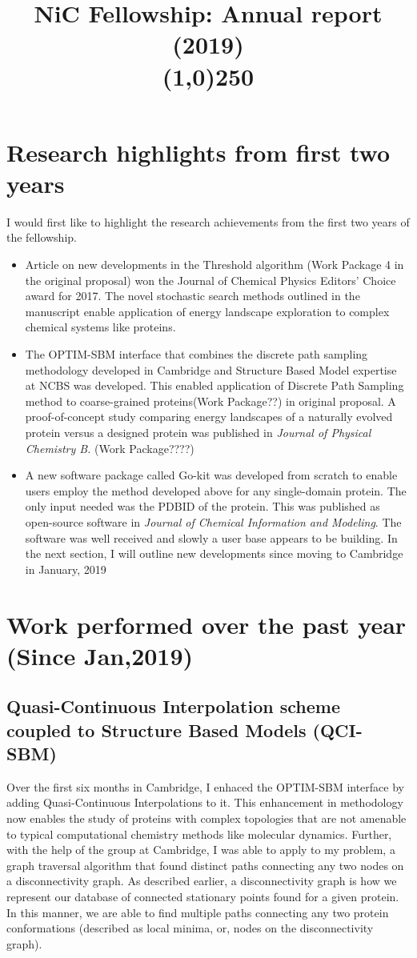\documentclass[a4paper,11pt]{article}
\title{ \vspace{-9ex}NiC Fellowship: Annual report (2019)\\\line(1,0){250}}
\date{\vspace{-11ex}}
\begin{document}
\maketitle
\section{Research highlights from first two years}
I would first like to highlight the research achievements from the  first two years of the fellowship. 
\begin{itemize}
    \item {Article on new developments in the Threshold algorithm (Work Package 4 in the original proposal) won the Journal of Chemical Physics Editors' Choice award for 2017. The novel stochastic search methods outlined in the manuscript enable application of energy landscape exploration to complex chemical systems like proteins.}
    \item{The OPTIM-SBM interface that combines the discrete path sampling methodology developed in Cambridge and Structure Based Model expertise at NCBS was developed.  This enabled application of Discrete Path Sampling method to coarse-grained proteins(Work Package??) in original proposal. A proof-of-concept study comparing energy landscapes of a naturally evolved protein versus a designed protein was published in \textit{Journal of  Physical Chemistry B.} (Work Package????)}
    \item{A new software package called Go-kit was developed from scratch to enable users employ the method developed above for any single-domain protein. The only input needed was the PDBID of the protein. This was published as open-source software in \textit{Journal of Chemical Information and Modeling}. The software was well received and slowly a user base appears to be building.}
    In the next section, I will outline new developments since moving to Cambridge in January, 2019
    

\end{itemize}
\section{Work performed over the past year (Since Jan,2019)}
\subsection{Quasi-Continuous Interpolation scheme coupled to Structure Based Models (QCI-SBM)} 
Over the first six months in Cambridge, I enhaced the OPTIM-SBM interface by adding Quasi-Continuous Interpolations to it. This enhancement in methodology now enables the study of proteins with complex topologies that are not amenable to typical computational chemistry methods like molecular dynamics. Further, with the help of the group at Cambridge, I was able to apply to my problem, a graph traversal algorithm that found distinct paths connecting any two nodes on a disconnectivity graph. As described earlier, a disconnectivity graph is how we represent our database of connected stationary points found for a given protein. In this manner, we are able to find multiple paths connecting any two protein conformations (described as local minima, or, nodes on the disconnectivity graph). 
\end{document}
